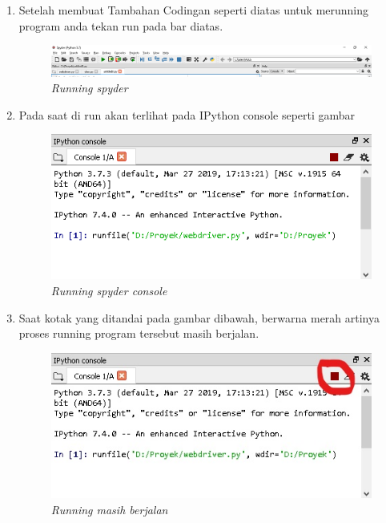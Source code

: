 \begin{enumerate}
\item Setelah membuat Tambahan Codingan  seperti diatas untuk merunning program anda tekan run pada bar diatas.
\begin{figure}[H]
    	\centering
    	\includegraphics[scale=0.3]{Figures/figures/run1.png}
    	\caption{\textit{Running spyder}}
    	\label{CLI}
	\end{figure}

\newpage

\item Pada saat di run akan terlihat pada IPython console seperti gambar 
\begin{figure}[H]
    	\centering
    	\includegraphics[scale=0.5]{Figures/figures/run2.png}
    	\caption{\textit{Running spyder console}}
    	\label{CLI}
	\end{figure}

\item Saat kotak yang ditandai pada gambar dibawah, berwarna merah artinya proses running program tersebut masih berjalan.
\begin{figure}[H]
    	\centering
    	\includegraphics[scale=0.5]{Figures/figures/run3.png}
    	\caption{\textit{Running masih berjalan}}
    	\label{CLI}
	\end{figure}


\end{enumerate}
